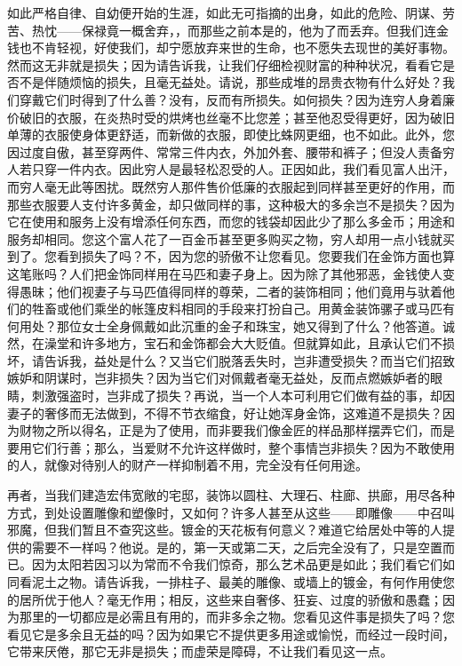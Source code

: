 如此严格自律、自幼便开始的生涯，如此无可指摘的出身，如此的危险、阴谋、劳苦、热忱——保禄竟一概舍弃，，而那些之前本是的，他为了而丢弃。但我们连金钱也不肯轻视，好使我们，却宁愿放弃来世的生命，也不愿失去现世的美好事物。然而这无非就是损失；因为请告诉我，让我们仔细检视财富的种种状况，看看它是否不是伴随烦恼的损失，且毫无益处。请说，那些成堆的昂贵衣物有什么好处？我们穿戴它们时得到了什么善？没有，反而有所损失。如何损失？因为连穷人身着廉价破旧的衣服，在炎热时受的烘烤也丝毫不比您差；甚至他忍受得更好，因为破旧单薄的衣服使身体更舒适，而新做的衣服，即使比蛛网更细，也不如此。此外，您因过度自傲，甚至穿两件、常常三件内衣，外加外套、腰带和裤子；但没人责备穷人若只穿一件内衣。因此穷人是最轻松忍受的人。正因如此，我们看见富人出汗，而穷人毫无此等困扰。既然穷人那件售价低廉的衣服起到同样甚至更好的作用，而那些衣服要人支付许多黄金，却只做同样的事，这种极大的多余岂不是损失？因为它在使用和服务上没有增添任何东西，而您的钱袋却因此少了那么多金币；用途和服务却相同。您这个富人花了一百金币甚至更多购买之物，穷人却用一点小钱就买到了。您看到损失了吗？不，因为您的骄傲不让您看见。您要我们在金饰方面也算这笔账吗？人们把金饰同样用在马匹和妻子身上。因为除了其他邪恶，金钱使人变得愚昧；他们视妻子与马匹值得同样的尊荣，二者的装饰相同；他们竟用与驮着他们的牲畜或他们乘坐的帐篷皮料相同的手段来打扮自己。用黄金装饰骡子或马匹有何用处？那位女士全身佩戴如此沉重的金子和珠宝，她又得到了什么？他答道。诚然，在澡堂和许多地方，宝石和金饰都会大大贬值。但就算如此，且承认它们不损坏，请告诉我，益处是什么？又当它们脱落丢失时，岂非遭受损失？而当它们招致嫉妒和阴谋时，岂非损失？因为当它们对佩戴者毫无益处，反而点燃嫉妒者的眼睛，刺激强盗时，岂非成了损失？再说，当一个人本可利用它们做有益的事，却因妻子的奢侈而无法做到，不得不节衣缩食，好让她浑身金饰，这难道不是损失？因为财物之所以得名，正是为了使用，而非要我们像金匠的样品那样摆弄它们，而是要用它们行善；那么，当爱财不允许这样做时，整个事情岂非损失？因为不敢使用的人，就像对待别人的财产一样抑制着不用，完全没有任何用途。\par

再者，当我们建造宏伟宽敞的宅邸，装饰以圆柱、大理石、柱廊、拱廊，用尽各种方式，到处设置雕像和塑像时，又如何？许多人甚至从这些——即雕像——中召叫邪魔，但我们暂且不查究这些。镀金的天花板有何意义？难道它给居处中等的人提供的需要不一样吗？他说。是的，第一天或第二天，之后完全没有了，只是空置而已。因为太阳若因习以为常而不令我们惊奇，那么艺术品更是如此；我们看它们如同看泥土之物。请告诉我，一排柱子、最美的雕像、或墙上的镀金，有何作用使您的居所优于他人？毫无作用；相反，这些来自奢侈、狂妄、过度的骄傲和愚蠢；因为那里的一切都应是必需且有用的，而非多余之物。您看见这件事是损失了吗？您看见它是多余且无益的吗？因为如果它不提供更多用途或愉悦，而经过一段时间，它带来厌倦，那它无非是损失；而虚荣是障碍，不让我们看见这一点。\par

